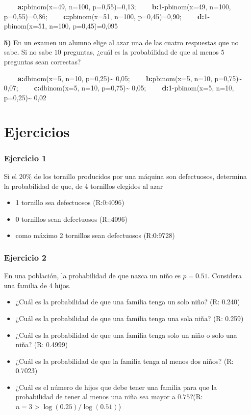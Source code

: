 \documentclass[
]{book}
\providecommand{\tightlist}{%
  \setlength{\itemsep}{0pt}\setlength{\parskip}{0pt}}
\begin{document}
\textbf{\(\qquad\)a:}pbinom(x=49, n=100, p=0,55)=0,13;
\textbf{\(\qquad\)b:}1-pbinom(x=49, n=100, p=0,55)=0,86;
\textbf{\(\qquad\)c:}pbinom(x=51, n=100, p=0,45)=0,90; \textbf{\(\qquad\)d:}1-pbinom(x=51, n=100, p=0,45)=0,095

\textbf{5)} En un examen un alumno elige al azar una de las cuatro respuestas que no sabe. Si no sabe \(10\) preguntas, ¿cuál es la probabilidad de que al menos \(5\) preguntas sean correctas?

\textbf{\(\qquad\)a:}dbinom(x=5, n=10, p=0,25)\textasciitilde{} 0,05; \textbf{\(\qquad\)b:}pbinom(x=5, n=10, p=0,75)\textasciitilde{} 0,07; \textbf{\(\qquad\)c:}dbinom(x=5, n=10, p=0,75)\textasciitilde{} 0,05; \textbf{\(\qquad\)d:}1-pbinom(x=5, n=10, p=0,25)\textasciitilde{} 0,02

\hypertarget{ejercicios-5}{%
\section{Ejercicios}\label{ejercicios-5}}

\hypertarget{ejercicio-1-4}{%
\subsubsection{Ejercicio 1}\label{ejercicio-1-4}}

Si el 20\% de los tornillo producidos por una máquina son defectuosos, determina la probabilidad de que, de
4 tornillos elegidos al azar

\begin{itemize}
\tightlist
\item
  1 tornillo sea defectuosos (R:0:4096)
\item
  0 tornillos sean defectuosos (R::4096)
\item
  como máximo 2 tornillos sean defectuosos (R:0:9728)
\end{itemize}

\hypertarget{ejercicio-2-4}{%
\subsubsection{Ejercicio 2}\label{ejercicio-2-4}}

En una población, la probabilidad de que nazca un niño es \(p=0.51\). Considera una familia de 4 hijos.

\begin{itemize}
\tightlist
\item
  ¿Cuál es la probabilidad de que una familia tenga un solo niño? (R: 0.240)
\item
  ¿Cuál es la probabilidad de que una familia tenga una sola niña? (R: 0.259)
\item
  ¿Cuál es la probabilidad de que una familia tenga solo un niño o solo una niña? (R: 0.4999)
\item
  ¿Cuál es la probabilidad de que la familia tenga al menos dos niños? (R: 0.7023)
\item
  ¿Cuál es el número de hijos que debe tener una familia para que la probabilidad de tener al menos una niña sea mayor a \(0.75\)?(R:\(n=3>\log(0.25)/\log(0.51)\))
\end{itemize}
\end{document}
